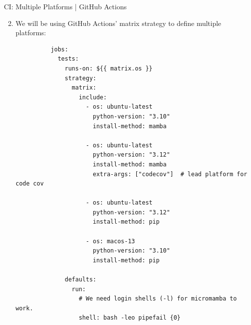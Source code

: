 \begin{darkframe}[fragile]{CI: Multiple Platforms | GitHub Actions}
  \begin{enumerate}
    \setcounter{enumi}{1}
    \item We will be using GitHub Actions' matrix strategy to define multiple platforms:
        \scriptsize
        \begin{verbatim}
          jobs:
            tests:
              runs-on: ${{ matrix.os }}
              strategy:
                matrix:
                  include:
                    - os: ubuntu-latest
                      python-version: "3.10"
                      install-method: mamba

                    - os: ubuntu-latest
                      python-version: "3.12"
                      install-method: mamba
                      extra-args: ["codecov"]  # lead platform for code cov

                    - os: ubuntu-latest
                      python-version: "3.12"
                      install-method: pip

                    - os: macos-13
                      python-version: "3.10"
                      install-method: pip

              defaults:
                run:
                  # We need login shells (-l) for micromamba to work.
                  shell: bash -leo pipefail {0}
        \end{verbatim}
  \end{enumerate}
\end{darkframe}

